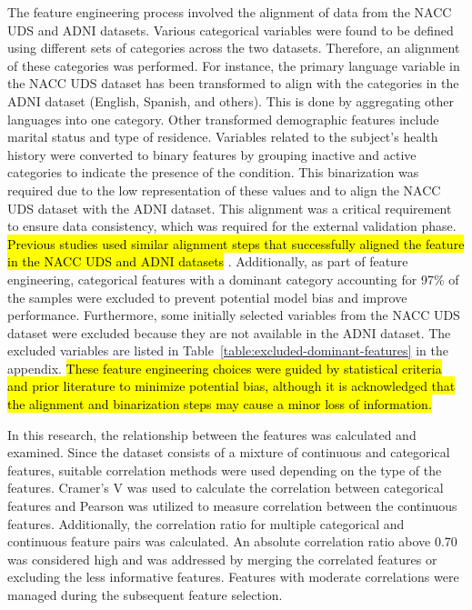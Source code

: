 The feature engineering process involved the alignment of data from the NACC UDS and ADNI datasets. Various categorical variables were found to be defined using different sets of categories across the two datasets. Therefore, an alignment of these categories was performed. For instance, the primary language variable in the NACC UDS dataset has been transformed to align with the categories in the ADNI dataset (English, Spanish, and others). This is done by aggregating other languages into one category. Other transformed demographic features include marital status and type of residence. Variables related to the subject's health history were converted to binary features by grouping inactive and active categories to indicate the presence of the condition. This binarization was required due to the low representation of these values and to align the NACC UDS dataset with the ADNI dataset. This alignment was a critical requirement to ensure data consistency, which was required for the external validation phase. \hl{Previous studies used similar alignment steps that successfully aligned the feature in the NACC UDS and ADNI datasets} \cite{abbas2024Explainable, Qiu2022Multimodal}. Additionally, as part of feature engineering, categorical features with a dominant category accounting for 97\% of the samples were excluded to prevent potential model bias and improve performance. Furthermore, some initially selected variables from the NACC UDS dataset were excluded because they are not available in the ADNI dataset. The excluded variables are listed in Table~\ref{table:excluded-dominant-features} in the appendix. \hl{These feature engineering choices were guided by statistical criteria and prior literature to minimize potential bias, although it is acknowledged that the alignment and binarization steps may cause a minor loss of information.}

In this research, the relationship between the features was calculated and examined. Since the dataset consists of a mixture of continuous and categorical features, suitable correlation methods were used depending on the type of the features. Cramer's V was used to calculate the correlation between categorical features and Pearson was utilized to measure correlation between the continuous features. Additionally, the correlation ratio for multiple categorical and continuous feature pairs was calculated. An absolute correlation ratio above 0.70 was considered high and was addressed by merging the correlated features or excluding the less informative features. Features with moderate correlations were managed during the subsequent feature selection.

